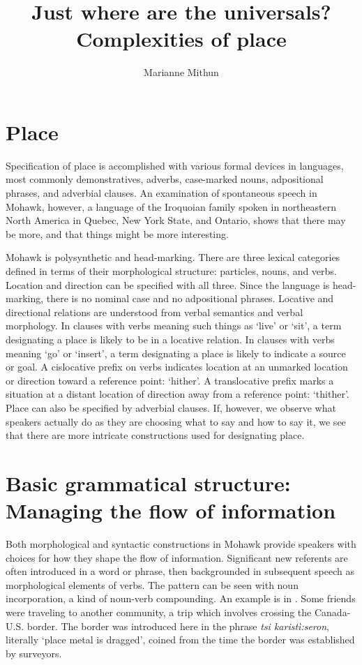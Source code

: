 \documentclass[output=paper,colorlinks,citecolor=brown]{langscibook}
\author{Marianne Mithun\orcid{}\affiliation{University of California, Santa Barbara}}
\title{Just where are the universals? Complexities of place}
\begin{document}
\maketitle

\section{Place}

Specification of place is accomplished with various formal devices in languages, most commonly demonstratives, adverbs, case-marked nouns, adpositional phrases, and adverbial clauses. An examination of spontaneous speech in Mohawk, however, a language of the Iroquoian family spoken in northeastern North America in Quebec, New York State, and Ontario, shows that there may be more, and that things might be more interesting.

Mohawk is polysynthetic and head-marking. There are three lexical categories defined in terms of their morphological structure: particles, nouns, and verbs. Location and direction can be specified with all three. Since the language is head-marking, there is no nominal case and no adpositional phrases. Locative and directional relations are understood from verbal semantics and verbal morphology. In clauses with verbs meaning such things as `live' or `sit', a term designating a place is likely to be in a locative relation. In clauses with verbs meaning `go' or `insert', a term designating a place is likely to indicate a source or goal. A cislocative prefix on verbs indicates location at an unmarked location or direction toward a reference point: `hither'. A translocative prefix marks a situation at a distant location of direction away from a reference point: `thither'. Place can also be specified by adverbial clauses. If, however, we observe what speakers actually do as they are choosing what to say and how to say it, we see that there are more intricate constructions used for designating place. 

\section{Basic grammatical structure: Managing the flow of information}
Both morphological and syntactic constructions in Mohawk provide speakers with choices for how they shape the flow of information. Significant new referents are often introduced in a word or phrase, then backgrounded in subsequent speech as morphological elements of verbs. The pattern can be seen with noun incorporation, a kind of noun-verb compounding. An example is in . Some friends were traveling to another community, a trip which involves crossing the Canada-U.S. border. The border was introduced here in the phrase \emph{tsi karistì:seron}, literally `place metal is dragged', coined from the time the border was established by surveyors. 
\end{document}
